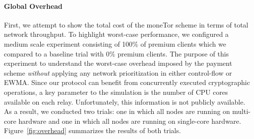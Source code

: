 \paragraph*{Global Overhead}
First, we attempt to show the total cost of the moneTor scheme in terms of total
network throughput. To highlight worst-case performance, we configured a medium
scale experiment consisting of 100\% of premium clients which we compared to a
baseline trial with 0\% premium clients. The purpose of this experiment to
understand the worst-case overhead imposed by the payment scheme \emph{without}
applying any network prioritization in either control-flow or EWMA. Since our
protocol can benefit from concurrently executed cryptographic operations, a key
parameter to the simulation is the number of CPU cores available on each relay.
Unfortunately, this information is not publicly available. As a result, we
conducted two trials: one in which all nodes are running on multi-core hardware
and one in which all nodes are running on single-core hardware.
Figure~\ref{fig:overhead} summarizes the results of both trials.


